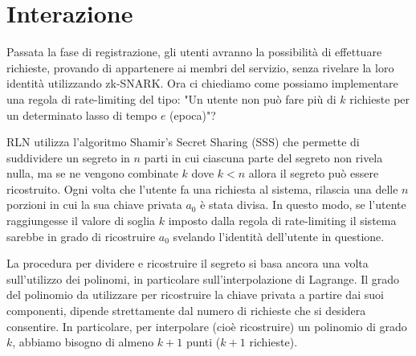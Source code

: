 \section{Interazione}
Passata la fase di registrazione, gli utenti avranno la possibilità di effettuare richieste, provando di appartenere ai
membri del servizio, senza rivelare la loro identità utilizzando zk-SNARK. Ora ci chiediamo come possiamo implementare una regola di
rate-limiting del tipo: "Un utente non può fare più di $k$ richieste per un determinato lasso di tempo $e$ (epoca)"?

RLN utilizza l'algoritmo Shamir's Secret Sharing (SSS) che permette di suddividere un segreto in $n$ parti in cui
ciascuna parte del segreto non rivela nulla, ma se ne vengono combinate $k$ dove $k < n$ allora il segreto può essere
ricostruito. Ogni volta che l'utente fa una richiesta al sistema, rilascia una delle $n$ porzioni in cui la sua chiave
privata $a_0$ è stata divisa. In questo modo, se l'utente raggiungesse il valore di soglia $k$ imposto dalla regola di
rate-limiting il sistema sarebbe in grado di ricostruire $a_0$ svelando l'identità dell'utente in questione.

La procedura per dividere e ricostruire il segreto si basa ancora una volta sull'utilizzo dei polinomi, in particolare
sull'interpolazione di Lagrange. Il grado del polinomio da utilizzare per ricostruire la chiave privata a partire dai
suoi componenti, dipende strettamente dal numero di richieste che si desidera consentire. In particolare, per interpolare
(cioè ricostruire) un polinomio di grado $k$, abbiamo bisogno di almeno $k+1$ punti ($k+1$ richieste).


